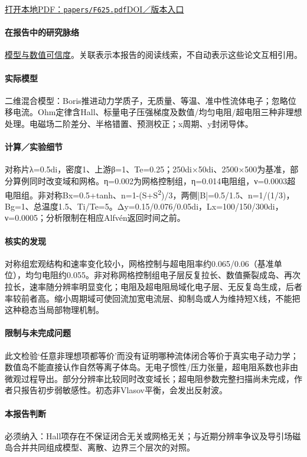 \documentclass[UTF8,a4paper,11pt,openany,fontset=fandol]{ctexbook}
\begin{document}
\href{run:../papers/F625.pdf}{打开本地PDF：\texttt{papers/F625.pdf}}\quad\href{https://doi.org/10.1063/1.4795727}{DOI／版本入口}

\paragraph{在报告中的研究脉络}\hyperref[V1-ch:numerics]{模型与数值可信度}。关联表示本报告的阅读线索，不自动表示这些论文互相引用。

\paragraph{实际模型}二维混合模型：Boris推进动力学质子，无质量、等温、准中性流体电子；忽略位移电流。Ohm定律含Hall、标量电子压强梯度及数值/均匀电阻/超电阻三种非理想处理。电磁场二阶差分、半格错置、预测校正；x周期、y封闭导体。

\paragraph{计算／实验细节}对称片λ=0.5di，密度1、上游β=1、Te=0.25；250di×50di、2500×500为基准，部分算例同时改变域和网格。η=0.002为网格控制组，η=0.014电阻组，ν=0.0003超电阻组。非对称Bx=0.5+tanh、n=1-(S+S\textsuperscript{2})/3，两侧|B|=0.5/1.5、n=1/(1/3)，Bg=1、总温度1.5、Ti/Te=5。Δy=0.15/0.076/0.05di，Lx=100/150/300di，ν=0.0005；分析限制在相应Alfvén返回时间之前。

\paragraph{核实的发现}对称组宏观结构和速率变化较小，网格控制与超电阻率约0.065/0.06（基准单位），均匀电阻约0.055。非对称网格控制组电子层反复拉长、数值撕裂成岛、再次拉长，速率随分辨率明显变化；电阻及超电阻局域化电子层、无反复岛生成，后者率较前者高。缩小周期域可使回流加宽电流层、抑制岛或人为维持短X线，不能把这种稳态当局部物理机制。

\paragraph{限制与未完成问题}此文检验‘任意非理想项都等价’而没有证明哪种流体闭合等价于真实电子动力学；数值岛不能直接认作自然等离子体岛。无电子惯性/压力张量，超电阻系数也非由微观过程导出。部分分辨率比较同时改变域长；超电阻参数完整扫描尚未完成，作者只报告初步弱敏感性。初态非Vlasov平衡，会发出反射波。

\paragraph{本报告判断}必须纳入：Hall项存在不保证闭合无关或网格无关；与近期分辨率争议及导引场磁岛合并共同组成模型、离散、边界三个层次的对照。
\end{document}

